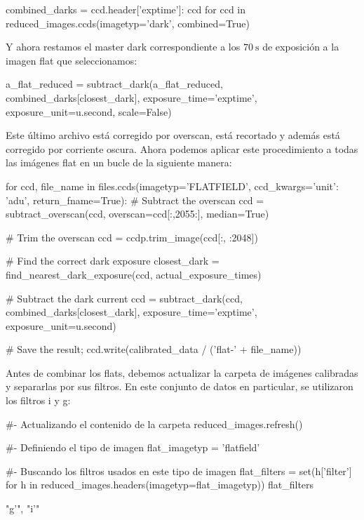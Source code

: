 \begin{pyin}
combined_darks = {ccd.header['exptime']: ccd for ccd in reduced_images.ccds(imagetyp='dark', combined=True)}
\end{pyin}

Y ahora restamos el master dark correspondiente a los $ 70 \mathrm{~s} $ de exposición a la imagen flat que seleccionamos:

\begin{pyin}
a_flat_reduced = subtract_dark(a_flat_reduced, 
                               combined_darks[closest_dark], 
                               exposure_time='exptime', 
                               exposure_unit=u.second, scale=False)
\end{pyin}

Este último archivo está corregido por overscan, está recortado y además está corregido por corriente oscura. Ahora podemos aplicar este procedimiento a todas las imágenes flat en un bucle  de la siguiente manera:

\begin{pyin}
for ccd, file_name in files.ccds(imagetyp='FLATFIELD',
                                 ccd_kwargs={'unit': 'adu'},
                                 return_fname=True):    
    # Subtract the overscan
    ccd = subtract_overscan(ccd, overscan=ccd[:,2055:], median=True)
    
    # Trim the overscan
    ccd = ccdp.trim_image(ccd[:, :2048])
    
    # Find the correct dark exposure
    closest_dark = find_nearest_dark_exposure(ccd, 
                                              actual_exposure_times)
    
    # Subtract the dark current 
    ccd = subtract_dark(ccd, combined_darks[closest_dark],
                        exposure_time='exptime', 
                        exposure_unit=u.second)

    # Save the result; 
    ccd.write(calibrated_data / ('flat-' + file_name))
\end{pyin}
 
 Antes de combinar los flats, debemos actualizar la carpeta de imágenes calibradas y separarlas por sus filtros. En este conjunto de datos en particular, se utilizaron los filtros i y g:
 
\begin{pyin}[]
#- Actualizando el contenido de la carpeta
reduced_images.refresh()

#- Definiendo el tipo de imagen
flat_imagetyp = 'flatfield'

#- Buscando los filtros usados en este tipo de imagen
flat_filters = set(h['filter'] for h in
                   reduced_images.headers(imagetyp=flat_imagetyp))
flat_filters
\end{pyin}
\begin{pyprint}
{"g'", "i'"}
\end{pyprint}

